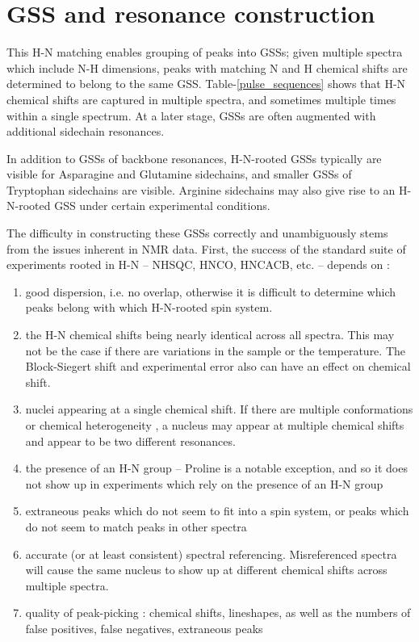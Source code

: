 \section{GSS and resonance construction}

This H-N matching enables grouping of peaks into GSSs; given multiple spectra
which include N-H dimensions, peaks with matching N and H chemical shifts are
determined to belong to the same GSS.
Table-\ref{pulse_sequences} shows that H-N chemical shifts are captured in 
multiple spectra, and sometimes multiple times within a single spectrum.
At a later stage, GSSs are often augmented with additional sidechain resonances.
	
In addition to GSSs of backbone resonances, H-N-rooted GSSs typically are 
visible for Asparagine and Glutamine sidechains, and smaller GSSs of 
Tryptophan sidechains are visible.  Arginine sidechains may also give rise 
to an H-N-rooted GSS under certain experimental conditions. 

The difficulty in constructing these GSSs correctly and unambiguously stems 
from the issues inherent in NMR data.  First, the success of the standard 
suite of experiments rooted in H-N -- NHSQC, HNCO, HNCACB, etc. -- depends 
on \cite{autoassign1997}: %
\begin{enumerate}
  \item good dispersion, i.e. no overlap, otherwise it is difficult to determine 
    which peaks belong with which H-N-rooted spin system.
  \item the H-N chemical shifts being nearly identical across all spectra.  
    This may not be the case if there are variations in the sample or the 
    temperature.  The Block-Siegert shift and experimental error also can have 
    an effect on chemical shift.
  \item nuclei appearing at a single chemical shift.  If there are multiple 
    conformations or chemical heterogeneity \cite{autoassign1997}, 
    a nucleus may appear at multiple chemical shifts and appear to be two 
    different resonances.
  \item the presence of an H-N group -- Proline is a notable exception, and 
    so it does not show up in experiments which rely on the presence of an H-N group
  \item extraneous peaks which do not seem to fit into a spin system, or 
    peaks which do not seem to match peaks in other spectra
  \item accurate (or at least consistent) spectral referencing.  
    Misreferenced spectra will cause the same nucleus to show up at different 
    chemical shifts across multiple spectra.
  \item quality of peak-picking \cite{autoassign1997, mars}: 
    chemical shifts, lineshapes, as well as the numbers of 
    false positives, false negatives, extraneous peaks
\end{enumerate}

